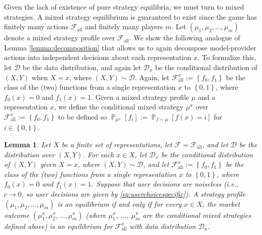 \documentclass[letterpaper,11pt]{article}
\newtheorem{lemma}{Lemma}
\theoremstyle{plain}
\DeclareMathOperator*{\Prob}{\mathbb{P}}
\begin{document}
Given the lack of existence of pure strategy equilibria, we must turn to mixed strategies. A mixed strategy equilibrium is guaranteed to exist since the game has finitely many actions $\mathcal{F}_{\text{all}}$ and finitely many players $m$. Let $(\mu_1, \mu_2, \ldots, \mu_m)$ denote a mixed strategy profile over $\mathcal{F}_{\text{all}}$. We show the following analogue of Lemma \ref{lemma:decomposition} that allows us to  again decompose model-provider actions into independent decisions about each representation $x$. To formalize this, let $\mathcal{D}$ be the data distribution, and again let $\mathcal{D}_x$ be the conditional distribution of $(X,Y)$ when $X = x$, where $(X,Y) \sim \mathcal{D}$. Again, let  $\mathcal{F}_{\text{all}}^x := \left\{f_0, f_1\right\}$ be the class of the (two) functions from a single representation $x$ to $\left\{0,1\right\}$, where $f_0(x) = 0$ and $f_1(x) = 1$.  Given a mixed strategy profile $\mu$ and a representation $x$, we define the conditional mixed strategy $\mu^x$ over $\mathcal{F}_{\text{all}}^x := \left\{f_0, f_1\right\}$ to be defined so $\Prob_{\mu^x}[f_i] := \Prob_{f \sim \mu}[f(x) = i]$ for $i \in \left\{0,1\right\}$. 
\begin{lemma}
\label{lemma:decompositionmixed}
Let $X$ be a finite set of representations, let $\mathcal{F} = \mathcal{F}_{\text{all}}$, and let $\mathcal{D}$ be the distribution over $(X,Y)$. For each $x \in X$, let $\mathcal{D}_x$ be the conditional distribution of $(X,Y)$ given $X = x$, where $(X,Y) \sim \mathcal{D}$, and let $\mathcal{F}_{\text{all}}^x := \left\{f_0, f_1\right\}$ be the class of the (two) functions from a single representation $x$ to $\left\{0,1\right\}$, where $f_0(x) = 0$ and $f_1(x) = 1$. Suppose that user decisions are noiseless (i.e., $c \rightarrow 0$, so user decisions are given by \eqref{eq:userchoicespecific}). A strategy profile $(\mu_1, \mu_2, \ldots, \mu_m)$ is an equilibrium if and only if for every $x \in X$, the market outcome $(\mu^x_1, \mu^x_2, \ldots, \mu^x_m)$ (where $\mu^x_1$, $\ldots$, $\mu^x_m$ are the conditional mixed strategies defined above) is an equilibrium for $\mathcal{F}_{\text{all}}^x$ with data distribution $\mathcal{D}_x$.
\end{lemma}
\end{document}

